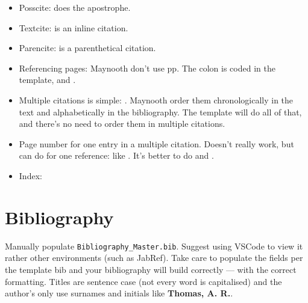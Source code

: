 \begin{itemize}
	\item Posscite:  does the apostrophe. 
	\item Textcite: \textcite{watling_2023} is an inline citation.
	\item Parencite: \parencite{watling_2025_panel} is a parenthetical citation.
	\item Referencing pages: Maynooth don't use pp. The colon is coded in the template, \textcite[5]{watling_2023} and \parencite[7--8]{DPR_2024}.
	\item Multiple citations is simple: \textcite{watling_2025_panel,watling_2023,Hall_2021_camouflage_platform}. Maynooth order them chronologically in the text and alphabetically in the bibliography. The template will do all of that, and there's no need to order them in multiple citations.
	\item Page number for one entry in a multiple citation. Doesn't really work, but can do for one reference: like \parencite[99--100]{watling_2023,Hall_2021_camouflage_platform}. It's better to do \parencite[99--100]{Hall_2021_camouflage_platform} and \parencite{watling_2023}.
	\item Index: 
\end{itemize}

\section*{Bibliography}
Manually populate \texttt{Bibliography\_Master.bib}. Suggest using VSCode to view it rather other environments (such as JabRef). Take care to populate the fields per the template bib and your bibliography will build correctly --- with the correct formatting. Titles are sentence case (not every word is capitalised) and the author's only use surnames and initials like \textbf{Thomas, A. R.}.

